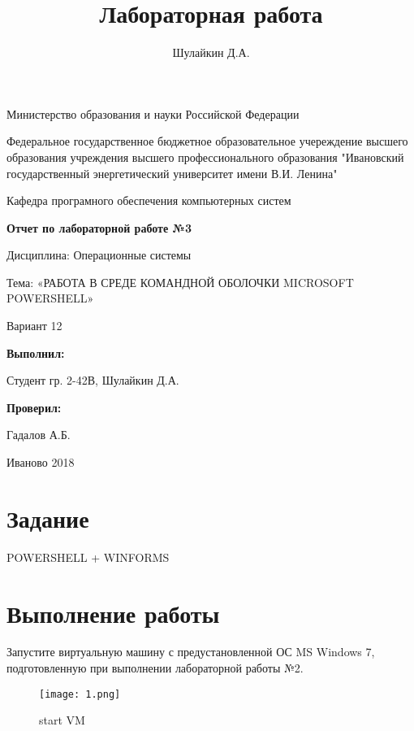 \documentclass[a4paper]{article}
\title{Лабораторная работа}
\author{Шулайкин Д.А.}
\begin{document}
\onehalfspacing
\thispagestyle{empty}
\begin{center}
Министерство образования и науки Российской Федерации
\vspace{10pt}

Федеральное государственное бюджетное образовательное учереждение высшего образования учреждения высшего профессионального образования "Ивановский государственный энергетический университет имени В.И. Ленина"
\vspace{40pt}

Кафедра програмного обеспечения компьютерных систем
\vspace{40pt}

\textbf{Отчет по лабораторной работе №3}

Дисциплина: Операционные системы

Тема: «РАБОТА В СРЕДЕ КОМАНДНОЙ ОБОЛОЧКИ MICROSOFT POWERSHELL»

Вариант 12
\end{center}

\vspace{330pt}
\begin{flushright}
\textbf{Выполнил:}

Студент гр. 2-42В, Шулайкин Д.А.

\textbf{Проверил:}

Гадалов А.Б.
\end{flushright}
\vspace{40pt}
\begin{center}
Иваново 2018
\end{center}
\pagebreak

\section{Задание}

POWERSHELL + WINFORMS
\begin{enumerate}
\end{enumerate}
\section{Выполнение работы}

Запустите виртуальную машину с предустановленной ОС MS Windows 7, подготовленную при выполнении лабораторной работы №2.
\begin{figure}[H]
    \centering
    \texttt{[image: 1.png]}
    \caption{start VM}
\end{figure}
\end{document}
